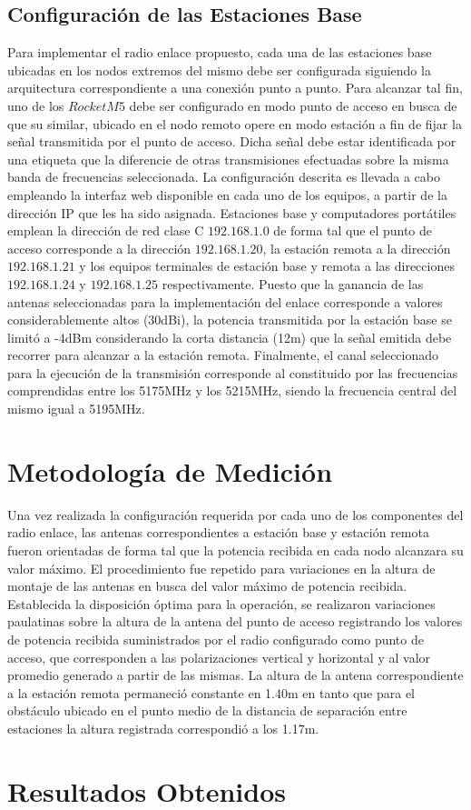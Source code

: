 \documentclass[conference]{IEEEtran}
\begin{document}
\subsection{Configuración de las Estaciones Base}
Para implementar el radio enlace propuesto, cada una de las estaciones base ubicadas en los nodos extremos del 
mismo debe ser configurada siguiendo la arquitectura correspondiente a una conexión punto a punto. Para alcanzar 
tal fin, uno de los $RocketM5$ debe ser configurado en modo punto de acceso en busca de que su similar, ubicado en el
nodo remoto opere en modo estación a fin de fijar la señal transmitida por el punto de acceso. Dicha señal debe estar
identificada por una etiqueta que la diferencie de otras transmisiones efectuadas sobre la misma banda de frecuencias 
seleccionada. La configuración descrita es llevada a cabo empleando la interfaz web disponible en cada uno de los equipos,
a partir de la dirección IP que les ha sido asignada. Estaciones base y computadores portátiles emplean la dirección de red 
clase C $\textit{192.168.1.0}$ de forma tal que el punto de acceso corresponde a la dirección $\textit{192.168.1.20}$, la estación remota a
la dirección $\textit{192.168.1.21}$ y los equipos terminales de estación base y remota a las direcciones $\textit{192.168.1.24}$ y $\textit{192.168.1.25}$
respectivamente. Puesto que la ganancia de las antenas seleccionadas para la implementación del enlace corresponde a valores
considerablemente altos (30dBi), la potencia transmitida por la estación base se limitó a -4dBm considerando la corta 
distancia (12m) que la señal emitida debe recorrer para alcanzar a la estación remota. Finalmente, el canal seleccionado 
para la ejecución de la transmisión corresponde al constituido por las frecuencias comprendidas entre los 5175MHz y los 5215MHz, 
siendo la frecuencia central del mismo igual a 5195MHz.
\section{Metodología de Medición}
Una vez realizada la configuración requerida por cada uno de los componentes del radio enlace, las antenas correspondientes a 
estación base y estación remota fueron orientadas de forma tal que la potencia recibida en cada nodo alcanzara su valor máximo. El 
procedimiento fue repetido para variaciones en la altura de montaje de las antenas en busca del valor máximo de potencia recibida. 
Establecida la disposición óptima para la operación, se realizaron variaciones paulatinas sobre la altura de la antena del punto de acceso
registrando los valores de potencia recibida suministrados por el radio configurado como punto de acceso, que corresponden a las polarizaciones vertical y horizontal 
y al valor promedio generado a partir de las mismas. La altura de la antena correspondiente a la estación remota permaneció constante en 1.40m en tanto
que para el obstáculo ubicado en el punto medio de la distancia de separación entre estaciones la altura registrada correspondió a los 1.17m.
\section{Resultados Obtenidos}
\end{document}
